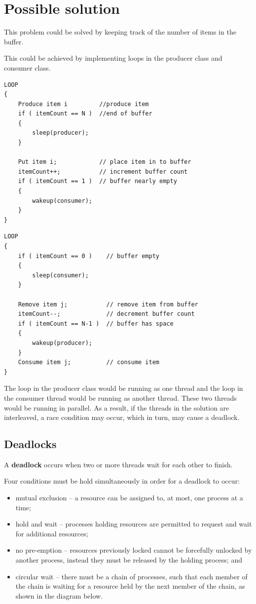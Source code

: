 \documentclass[a4paper]{systems-software}
\begin{document}
\section*{Possible solution}

This problem could be solved by keeping track of the number of items in the buffer.

This could be achieved by implementing loops in the producer class and consumer class.

\begin{lstlisting}[title={Producer class.}]
LOOP
{
	Produce item i         //produce item
	if ( itemCount == N )  //end of buffer
	{
		sleep(producer);
	}

	Put item i;            // place item in to buffer
	itemCount++;           // increment buffer count
	if ( itemCount == 1 )  // buffer nearly empty
	{
		wakeup(consumer);
	}
}
\end{lstlisting}

\begin{lstlisting}[title={Consumer class.}]
LOOP
{
	if ( itemCount == 0 )    // buffer empty
	{
		sleep(consumer);
	}

	Remove item j;           // remove item from buffer
	itemCount--;             // decrement buffer count
	if ( itemCount == N-1 )  // buffer has space
	{
		wakeup(producer);
	}
	Consume item j;          // consume item
}
\end{lstlisting}

The loop in the producer class would be running as one thread and the loop in the consumer thread would be running as another thread. These two threads would be running in parallel. As a result, if the threads in the solution are interleaved, a race condition may occur, which in turn, may cause a deadlock.


\subsection*{Deadlocks}

A \textbf{deadlock} occurs when two or more threads wait for each other to finish.

Four conditions must be hold simultaneously in order for a deadlock to occur:
\begin{itemize}
	\item mutual exclusion -- a resource can be assigned to, at most, one process at a time;
	\item hold and wait -- processes holding resources are permitted to request and wait for additional resources;
	\item no pre-emption	 -- resources previously locked cannot be forcefully unlocked by another process, instead they must be released by the holding process; and
	\item circular wait -- there must be a chain of processes, such that each member of the chain is waiting for a resource held by the next member of the chain, as shown in the diagram below.
\end{itemize}
\end{document}
